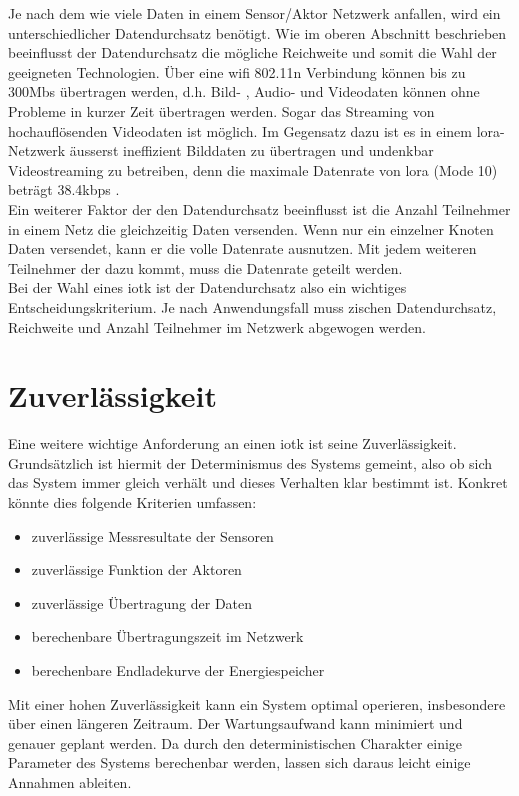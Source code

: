 Je nach dem wie viele Daten in einem Sensor/Aktor Netzwerk anfallen, wird ein unterschiedlicher Datendurchsatz benötigt. Wie im oberen Abschnitt beschrieben beeinflusst der Datendurchsatz die mögliche Reichweite und somit die Wahl der geeigneten Technologien. Über eine \gls{wifi} 802.11n Verbindung können bis zu 300Mbs übertragen werden, d.h. Bild- , Audio- und Videodaten können ohne Probleme in kurzer Zeit übertragen werden. Sogar das Streaming von hochauflösenden Videodaten ist möglich. Im Gegensatz dazu ist es in einem \gls{lora}-Netzwerk äusserst ineffizient Bilddaten zu übertragen und undenkbar Videostreaming zu betreiben, denn die maximale Datenrate von \gls{lora} (Mode 10) beträgt 38.4kbps \autocite[2]{lora:FAQ}.\\
Ein weiterer Faktor der den Datendurchsatz beeinflusst ist die Anzahl Teilnehmer in einem Netz die gleichzeitig Daten versenden. Wenn nur ein einzelner Knoten Daten versendet, kann er die volle Datenrate ausnutzen. Mit jedem weiteren Teilnehmer der dazu kommt, muss die Datenrate geteilt werden.\\
Bei der Wahl eines \gls{iotk} ist der Datendurchsatz also ein wichtiges Entscheidungskriterium. Je nach Anwendungsfall muss zischen Datendurchsatz, Reichweite und Anzahl Teilnehmer im Netzwerk abgewogen werden.

\section{Zuverlässigkeit}

Eine weitere wichtige Anforderung an einen \gls{iotk} ist seine Zuverlässigkeit. Grundsätzlich ist hiermit der Determinismus des Systems gemeint, also ob sich das System immer gleich verhält und dieses Verhalten klar bestimmt ist. Konkret könnte dies folgende Kriterien umfassen:
\begin{itemize}  
  \item zuverlässige Messresultate der Sensoren
  \item zuverlässige Funktion der Aktoren
  \item zuverlässige Übertragung der Daten
  \item berechenbare Übertragungszeit im Netzwerk 
  \item berechenbare Endladekurve der Energiespeicher
\end{itemize}

Mit einer hohen Zuverlässigkeit kann ein System optimal operieren, insbesondere über einen längeren Zeitraum. Der Wartungsaufwand kann minimiert und genauer geplant werden. Da durch den deterministischen Charakter einige Parameter des Systems berechenbar werden, lassen sich daraus leicht einige Annahmen ableiten.


